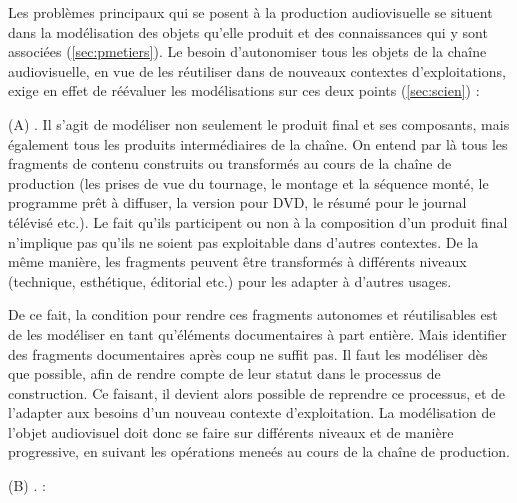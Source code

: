 Les problèmes principaux qui se posent à la production audiovisuelle se situent dans la modélisation des objets qu'elle produit et des connaissances qui y sont associées (\ref{sec:pmetiers}). 
Le besoin d'autonomiser tous les objets de la chaîne audiovisuelle, en vue de les réutiliser dans de nouveaux contextes d'exploitations, exige en effet de réévaluer les modélisations sur ces deux points (\ref{sec:scien}) : 
\begin{liste}
	\item[(A)] .
	Il s'agit de modéliser non seulement le produit final et ses composants, mais également tous les produits intermédiaires de la chaîne.
	On entend par là tous les fragments de contenu construits ou transformés au cours de la chaîne de production (les prises de vue du tournage, le montage et la séquence monté, le programme prêt à diffuser, la version pour DVD, le résumé pour le journal télévisé etc.).
	Le fait qu'ils participent ou non à la composition d'un produit final n'implique pas qu'ils ne soient pas exploitable dans d'autres contextes.
	De la même manière, les fragments peuvent être transformés à différents niveaux (technique, esthétique, éditorial etc.) pour les adapter à d'autres usages. 

	De ce fait, la condition pour rendre ces fragments autonomes et réutilisables est de les modéliser en tant qu'éléments documentaires à part entière.	
	Mais identifier des fragments documentaires après coup ne suffit pas. 
	Il faut les modéliser dès que possible, afin de rendre compte de leur statut dans le processus de construction. 
	Ce faisant, il devient alors possible de reprendre ce processus, et de l'adapter aux besoins d'un nouveau contexte d'exploitation. 
	La modélisation de l'objet audiovisuel doit donc se faire sur différents niveaux et de manière progressive, en suivant les opérations meneés au cours de la chaîne de production.\\


	\item[(B)] .
:

\end{liste}

